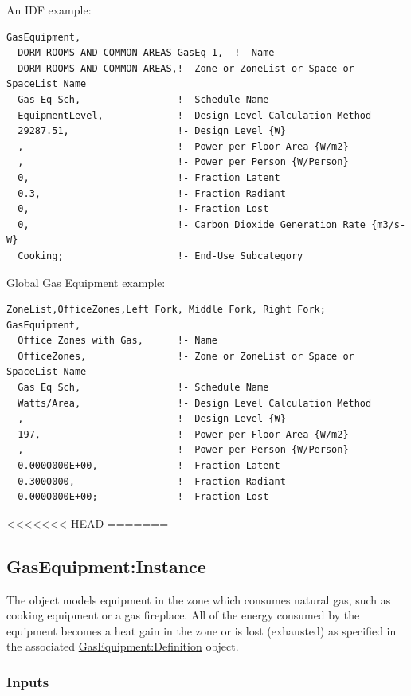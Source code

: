 An IDF example:

\begin{lstlisting}
GasEquipment,
  DORM ROOMS AND COMMON AREAS GasEq 1,  !- Name
  DORM ROOMS AND COMMON AREAS,!- Zone or ZoneList or Space or SpaceList Name
  Gas Eq Sch,                 !- Schedule Name
  EquipmentLevel,             !- Design Level Calculation Method
  29287.51,                   !- Design Level {W}
  ,                           !- Power per Floor Area {W/m2}
  ,                           !- Power per Person {W/Person}
  0,                          !- Fraction Latent
  0.3,                        !- Fraction Radiant
  0,                          !- Fraction Lost
  0,                          !- Carbon Dioxide Generation Rate {m3/s-W}
  Cooking;                    !- End-Use Subcategory
\end{lstlisting}

Global Gas Equipment example:

\begin{lstlisting}
ZoneList,OfficeZones,Left Fork, Middle Fork, Right Fork;
GasEquipment,
  Office Zones with Gas,      !- Name
  OfficeZones,                !- Zone or ZoneList or Space or SpaceList Name
  Gas Eq Sch,                 !- Schedule Name
  Watts/Area,                 !- Design Level Calculation Method
  ,                           !- Design Level {W}
  197,                        !- Power per Floor Area {W/m2}
  ,                           !- Power per Person {W/Person}
  0.0000000E+00,              !- Fraction Latent
  0.3000000,                  !- Fraction Radiant
  0.0000000E+00;              !- Fraction Lost
\end{lstlisting}

<<<<<<< HEAD
=======

\subsection{GasEquipment:Instance}\label{gasequipmentinstance}

The object models equipment in the zone which consumes natural gas, such as cooking equipment or a gas fireplace. All of the energy consumed by the equipment becomes a heat gain in the zone or is lost (exhausted) as specified in the associated \hyperref[gasequipmentdefinition]{GasEquipment:Definition} object.

\subsubsection{Inputs}\label{inputs-4-017-gas-instance}

